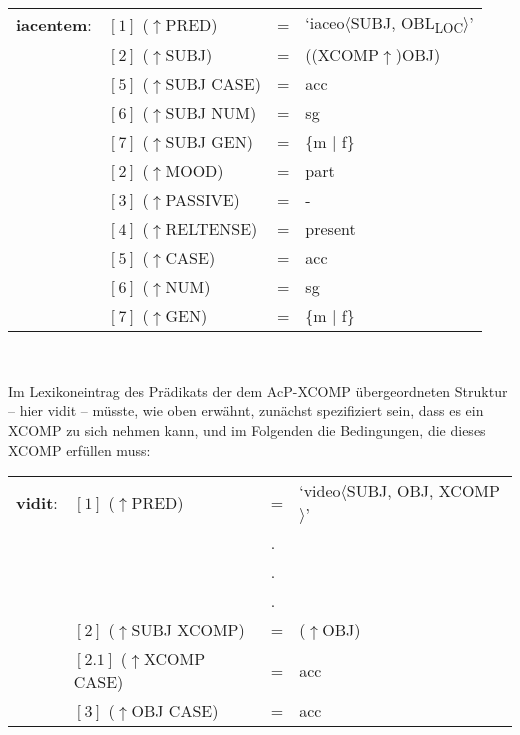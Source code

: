 \documentclass[12pt,a4paper]{article}
\begin{document}
\begin{singlespace}
\begin{tabular}{ l  l  l  l  } 
\textbf{iacentem}: & $[1]$ \: ($\uparrow$PRED) & = & `iaceo$\langle$SUBJ, OBL\textsubscript{LOC}$\rangle$'\\
$\qquad$ & $[2]$ \:  ($\uparrow$SUBJ) & = & ((XCOMP$\uparrow$)OBJ)\\
$\qquad$ & $[5]$ \: ($\uparrow$SUBJ CASE) & = & acc \\
$\qquad$ & $[6]$ \: ($\uparrow$SUBJ NUM) & = & sg \\
$\qquad$ & $[7]$ \: ($\uparrow$SUBJ GEN) & = & \{m $\mid$ f\} \\
$\qquad$ & $[2]$ \: ($\uparrow$MOOD) & = & part\\
$\qquad$ & $[3]$ \: ($\uparrow$PASSIVE) & = & - \\
$\qquad$ & $[4]$ \: ($\uparrow$RELTENSE) & = & present \\
$\qquad$ & $[5]$ \: ($\uparrow$CASE) & = & acc \\
$\qquad$ & $[6]$ \: ($\uparrow$NUM) & = & sg \\
$\qquad$ & $[7]$ \: ($\uparrow$GEN) & = & \{m $\mid$ f\} \\
\end{tabular}\\
\newline
\end{singlespace}
Im Lexikoneintrag des Prädikats der dem AcP-XCOMP übergeordneten Struktur -- hier vidit -- müsste, wie oben erwähnt, zunächst spezifiziert sein, dass es ein XCOMP zu sich nehmen kann, und im Folgenden die Bedingungen, die dieses XCOMP erfüllen muss: \\
\begin{singlespace}
\begin{tabular}{ l  l  l  l  } 
\textbf{vidit}: & $[1]$ \: ($\uparrow$PRED) & = & `video$\langle$SUBJ, OBJ, XCOMP$\rangle$'\\
$\qquad$ & $\qquad$ & . \\
$\qquad$ & $\qquad$ & . \\
$\qquad$ & $\qquad$ & . \\
$\qquad$ & $[2]$ \:  ($\uparrow$SUBJ XCOMP) & = & ($\uparrow$OBJ)\\
$\qquad$ & $[2.1]$ \: ($\uparrow$XCOMP CASE) & = & acc \\
$\qquad$ & $[3]$ \: ($\uparrow$OBJ CASE) & = & acc \\
\end{tabular}\\
\newline
\end{singlespace}
\end{document}
